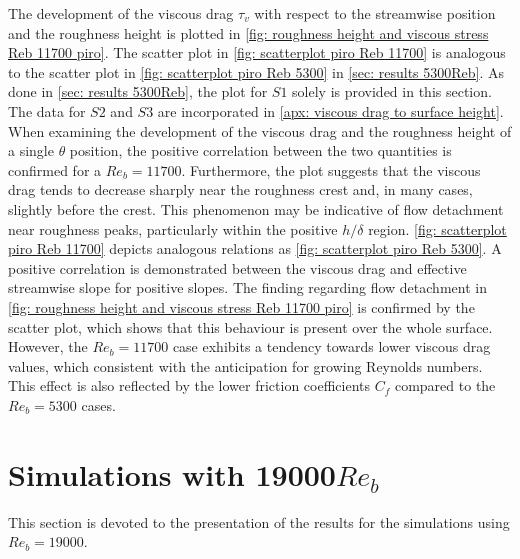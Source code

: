 The development of the viscous drag $\tau_v$ with respect to the streamwise position and the roughness height is plotted in \autoref{fig: roughness height and viscous stress Reb 11700 piro}.
The scatter plot in \autoref{fig: scatterplot piro Reb 11700} is analogous to the scatter plot in  \autoref{fig: scatterplot piro Reb 5300} in \autoref{sec: results 5300Reb}.
As done in \autoref{sec: results 5300Reb}, the plot for $S1$ solely is provided in this section. The data for $S2$ and $S3$  are  incorporated in \autoref{apx: viscous drag to surface height}.
When examining the development of the viscous drag and the roughness height of a single $\theta$ position, the positive correlation between the two quantities is confirmed for a $Re_b = 11700$.
Furthermore, the plot suggests that the viscous drag tends to decrease sharply near the roughness crest and, in many cases, slightly before the crest.
This phenomenon may be indicative of  flow detachment near roughness peaks, particularly within  the positive $h/\delta$ region.
\autoref{fig: scatterplot piro Reb 11700} depicts analogous relations as \autoref{fig: scatterplot piro Reb 5300}.
A positive correlation is demonstrated between the viscous drag and effective streamwise slope for positive slopes.
The finding regarding flow detachment in \autoref{fig: roughness height and viscous stress Reb 11700 piro} is confirmed by the scatter plot, which shows that this behaviour is present over the whole surface.
However, the $Re_b = 11700$ case exhibits  a tendency towards lower viscous drag values, which consistent with the  anticipation for growing Reynolds numbers.
This effect is also reflected by the lower friction coefficients $C_f$ compared to the $Re_b = 5300$ cases.

\section{Simulations with 19000$Re_b$}\label{sec: results 19000 Reb}

This section is devoted to the presentation of the results for the simulations using $Re_b = 19000$.

